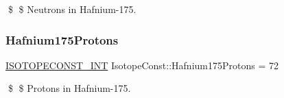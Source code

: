 \$ \$ Neutrons in Hafnium-\/175. \mbox{\label{group___isotope_const-_hafnium-_hf175_gae7463374718cfce819bdbf30c5553ccc}} 
\subsubsection{\texorpdfstring{Hafnium175\+Protons}{Hafnium175Protons}}
{\footnotesize\ttfamily \mbox{\hyperlink{group___isotope_const-_macros_ga5f18360b3e99483a35c32d789e62621c}{I\+S\+O\+T\+O\+P\+E\+C\+O\+N\+S\+T\+\_\+\+I\+NT}} Isotope\+Const\+::\+Hafnium175\+Protons = 72}

\$ \$ Protons in Hafnium-\/175. 